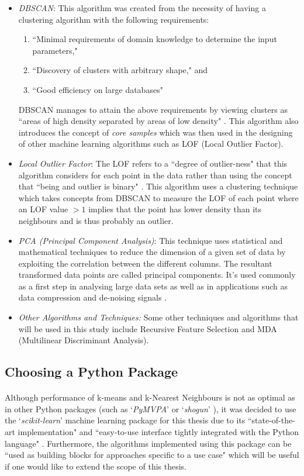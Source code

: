 \documentclass[12pt, twoside]{report}
\begin{document}
	\begin{itemize} 
		\item \textit{DBSCAN}: This algorithm was created from the necessity of having a clustering algorithm with the following requirements:
		\begin{enumerate}
			\item ``Minimal requirements of domain knowledge to determine the input parameters,"
			\item ``Discovery of clusters with arbitrary shape," and
			\item ``Good efficiency on large databases" \cite{r:DBSCAN}
		\end{enumerate}
		DBSCAN manages to attain the above requirements by viewing clusters as ``areas of high density separated by areas of low density" \cite{r:skclustering}. This algorithm also introduces the concept of \textit{core samples} which was then used in the designing of other machine learning algorithms such as LOF (Local Outlier Factor).
		\item \textit{Local Outlier Factor}: The LOF refers to a ``degree of outlier-ness" that this algorithm considers for each point in the data rather than using the concept that ``being and outlier is binary" \cite{r:LOF}. This algorithm uses a clustering technique which takes concepts from DBSCAN to measure the LOF of each point where an LOF value $>1$ implies that the point has lower density than its neighbours and is thus probably an outlier. 
		\item \textit{PCA (Principal Component Analysis)}: This technique uses statistical and mathematical techniques to reduce the dimension of a given set of data by exploiting the correlation between the different columns. The resultant transformed data points are called principal components. It's used commonly as a first step in analysing large data sets as well as in applications such as data compression and de-noising signals \cite{r:PCA}.
		\item \textit{Other Algorithms and Techniques:} Some other techniques and algorithms that will be used in this study include Recursive Feature Selection and MDA (Multilinear Discriminant Analysis). 
	\end{itemize}
	
		
	\subsection{Choosing a Python Package}
	\paragraph{ }Although performance of k-means and k-Nearest Neighbours is not as optimal as in other Python packages (such as `\textit{PyMVPA}' \cite{r:pymvpa} or `\textit{shogun}' \cite{r:shogun}), it was decided to use the `\textit{scikit-learn}' machine learning package for this thesis due to its ``state-of-the-art implementation" and ``easy-to-use interface tightly integrated with the Python language" \cite{r:sklearn}. Furthermore, the algorithms implemented using this package can be ``used as building blocks for approaches specific to a use case" \cite{r:sklearn} which will be useful if one would like to extend the scope of this thesis.
	
\end{document}
